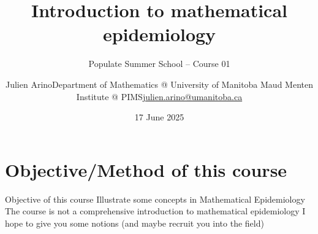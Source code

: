 \documentclass[aspectratio=169]{beamer}\usepackage[]{graphicx}\usepackage[]{xcolor}
\title{Introduction to mathematical epidemiology}
\subtitle{Populate Summer School -- Course 01}
\date{17 June 2025}
\author{\texorpdfstring{Julien Arino\newline Department of Mathematics @ University of Manitoba \newline Maud Menten Institute @ PIMS\newline\url{julien.arino@umanitoba.ca}}{Julien Arino}}
\begin{document}


\section*{Objective/Method of this course}

% 

\begin{frame}{Objective of this course}
\bbullet
Illustrate some concepts in Mathematical Epidemiology
\vfill
\bbullet The course is not a comprehensive introduction to mathematical epidemiology
\vfill
\bbullet I hope to give you some notions (and maybe recruit you into the field)
\end{frame}

 
\end{document}
